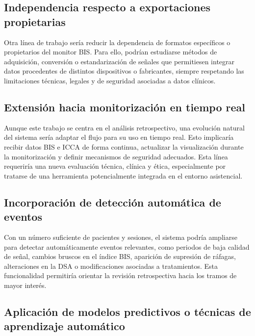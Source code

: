 \documentclass[
  spanish,
  a4paper,
  12pt,
  twoside]{memoir}
\begin{document}
\subsection{Independencia respecto a exportaciones
propietarias}\label{independencia-respecto-a-exportaciones-propietarias}

Otra línea de trabajo sería reducir la dependencia de formatos
específicos o propietarios del monitor BIS. Para ello, podrían
estudiarse métodos de adquisición, conversión o estandarización de
señales que permitiesen integrar datos procedentes de distintos
dispositivos o fabricantes, siempre respetando las limitaciones
técnicas, legales y de seguridad asociadas a datos clínicos.

\subsection{Extensión hacia monitorización en tiempo
real}\label{extensiuxf3n-hacia-monitorizaciuxf3n-en-tiempo-real}

Aunque este trabajo se centra en el análisis retrospectivo, una
evolución natural del sistema sería adaptar el flujo para su uso en
tiempo real. Esto implicaría recibir datos BIS e ICCA de forma continua,
actualizar la visualización durante la monitorización y definir
mecanismos de seguridad adecuados. Esta línea requeriría una nueva
evaluación técnica, clínica y ética, especialmente por tratarse de una
herramienta potencialmente integrada en el entorno asistencial.

\subsection{Incorporación de detección automática de
eventos}\label{incorporaciuxf3n-de-detecciuxf3n-automuxe1tica-de-eventos}

Con un número suficiente de pacientes y sesiones, el sistema podría
ampliarse para detectar automáticamente eventos relevantes, como
periodos de baja calidad de señal, cambios bruscos en el índice BIS,
aparición de supresión de ráfagas, alteraciones en la DSA o
modificaciones asociadas a tratamientos. Esta funcionalidad permitiría
orientar la revisión retrospectiva hacia los tramos de mayor interés.

\subsection{Aplicación de modelos predictivos o técnicas de aprendizaje
automático}\label{aplicaciuxf3n-de-modelos-predictivos-o-tuxe9cnicas-de-aprendizaje-automuxe1tico}
\end{document}
